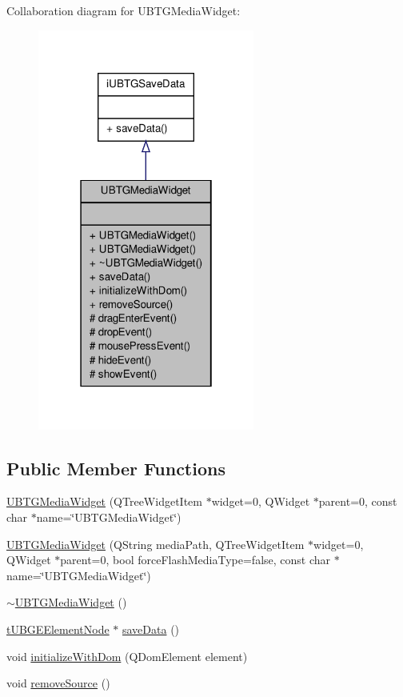 Collaboration diagram for U\-B\-T\-G\-Media\-Widget\-:
\nopagebreak
\begin{figure}[H]
\begin{center}
\leavevmode
\includegraphics[width=202pt]{da/daa/class_u_b_t_g_media_widget__coll__graph}
\end{center}
\end{figure}
\subsection*{Public Member Functions}
\begin{DoxyCompactItemize}
\item 
\hyperlink{class_u_b_t_g_media_widget_a72634901e00f4787ff89f076f3bf70fd}{U\-B\-T\-G\-Media\-Widget} (Q\-Tree\-Widget\-Item $\ast$widget=0, Q\-Widget $\ast$parent=0, const char $\ast$name=\char`\"{}U\-B\-T\-G\-Media\-Widget\char`\"{})
\item 
\hyperlink{class_u_b_t_g_media_widget_ab20491da299b42adaf8df4fda6c7132d}{U\-B\-T\-G\-Media\-Widget} (Q\-String media\-Path, Q\-Tree\-Widget\-Item $\ast$widget=0, Q\-Widget $\ast$parent=0, bool force\-Flash\-Media\-Type=false, const char $\ast$name=\char`\"{}U\-B\-T\-G\-Media\-Widget\char`\"{})
\item 
\hyperlink{class_u_b_t_g_media_widget_afc5416c40df6ea2a6bcb103b95300b84}{$\sim$\-U\-B\-T\-G\-Media\-Widget} ()
\item 
\hyperlink{structt_u_b_g_e_element_node}{t\-U\-B\-G\-E\-Element\-Node} $\ast$ \hyperlink{class_u_b_t_g_media_widget_ac177158c97513607a23b7dc698ef69ef}{save\-Data} ()
\item 
void \hyperlink{class_u_b_t_g_media_widget_a9567b139af4ad75e27e84641ae91562f}{initialize\-With\-Dom} (Q\-Dom\-Element element)
\item 
void \hyperlink{class_u_b_t_g_media_widget_aa8b56272815c9d98905b2d8fba00ac95}{remove\-Source} ()
\end{DoxyCompactItemize}
